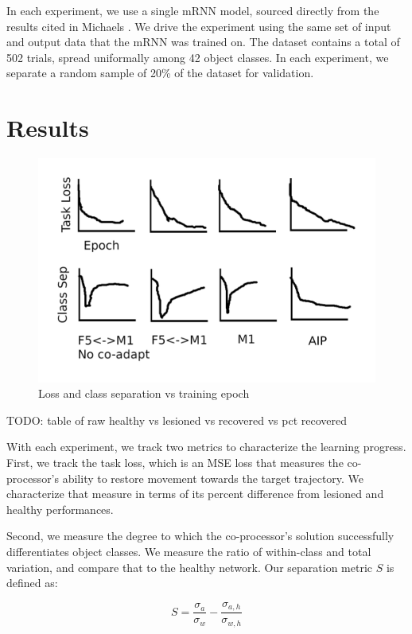 \documentclass[12pt]{iopart}
\begin{document}
In each experiment, we use a single mRNN model, sourced directly from the results
cited in Michaels \cite{michaels.mrnn}. We drive the experiment using the same set of
input and output data that the mRNN was trained on. The dataset contains a total of
502 trials, spread uniformally among 42 object classes. In each experiment, we separate
a random sample of 20\% of the dataset for validation.

\section{Results}
\label{sec:results}

\begin{figure}[h]
\includegraphics[width=\textwidth]{results_standin.png}
\caption{Loss and class separation vs training epoch}
\centering
\label{fig:results}
\end{figure}

TODO: table of raw healthy vs lesioned vs recovered vs pct recovered

With each experiment, we track two metrics to characterize the learning progress. First, we
track the task loss, which is an MSE loss that measures the co-processor's ability to restore
movement towards the target trajectory. We characterize that measure in terms of its percent
difference from lesioned and healthy performances.

Second, we measure the degree to which the co-processor's solution successfully
differentiates object classes. We measure the ratio of within-class and total variation,
and compare that to the healthy network. Our separation metric $S$ is defined as:

\begin{equation}
	S = \frac{\sigma_{a}}{\sigma_{w}} - \frac{\sigma_{a,h}}{\sigma_{w,h}}
\end{equation}
\end{document}
